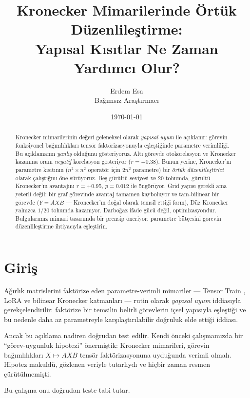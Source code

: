 \documentclass[11pt,a4paper]{article}
\title{Kronecker Mimarilerinde Örtük Düzenlileştirme:\\
Yapısal Kısıtlar Ne Zaman Yardımcı Olur?}
\author{Erdem Esa\\ \small Bağımsız Araştırmacı}
\date{\today}
\begin{document}
\maketitle

\begin{abstract}
Kronecker mimarilerinin değeri geleneksel olarak \emph{yapısal uyum}
ile açıklanır: görevin fonksiyonel bağımlılıkları tensör
faktörizasyonuyla eşleştiğinde parametre verimliliği. Bu açıklamanın
\emph{yanlış} olduğunu gösteriyoruz. Altı görevde otokorelasyon ve
Kronecker kazanma oranı \emph{negatif} korelasyon gösteriyor
($r = -0.38$). Bunun yerine, Kronecker'ın parametre kısıtının
($n^2 \times n^2$ operatör için $2n^2$ parametre) bir \emph{örtük
düzenlileştirici} olarak çalıştığını öne sürüyoruz. Beş gürültü
seviyesi ve 20 tohumda, gürültü Kronecker'ın avantajını
$r = +0.95$, $p = 0.012$ ile öngörüyor. Grid yapısı gerekli ama
yeterli değil: bir graf görevinde avantaj tamamen kayboluyor ve
tam-bilinear bir görevde ($Y = AXB$ --- Kronecker'ın doğal olarak
temsil ettiği form), Düz Kronecker yalnızca $1/20$ tohumda
kazanıyor. Darboğaz ifade gücü değil, optimizasyondur. Bulgularımız
mimari tasarımda bir prensip öneriyor: parametre bütçesini görevin
düzenlileştirme ihtiyacıyla eşleştirin.
\end{abstract}


\section{Giriş}
\label{sec:intro}

Ağırlık matrislerini faktörize eden parametre-verimli mimariler
--- Tensor Train \cite{novikov2015tensor}, LoRA \cite{hu2021lora}
ve bilinear Kronecker katmanları \cite{tolstikhin2021mlp} ---
rutin olarak \emph{yapısal uyum} iddiasıyla gerekçelendirilir:
faktörize bir temsilin belirli görevlerin içsel yapısıyla
eşleştiği ve bu nedenle daha az parametreyle karşılaştırılabilir
doğruluk elde ettiği iddiası.

Ancak bu açıklama nadiren doğrudan test edilir. Kendi önceki
çalışmamızda \cite{esa2026preprint2} bir ``görev-uygunluk
hipotezi'' önermiştik: Kronecker mimarileri, görevin
bağımlılıkları $X \mapsto AXB$ tensör faktörizasyonuna uyduğunda
verimli olmalı. Hipotez makuldü, gözlenen veriyle tutarlıydı
ve hiçbir zaman resmen çürütülmemişti.

Bu çalışma onu doğrudan teste tabi tutar.
\end{document}
